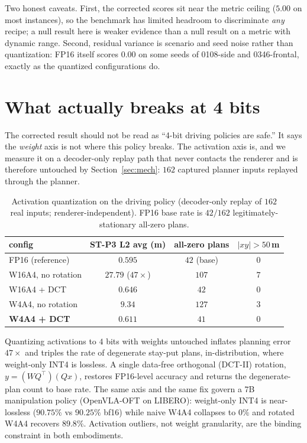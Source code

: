 \documentclass[conference]{IEEEtran}
\begin{document}
Two honest caveats. First, the corrected scores sit near the metric ceiling ($5.00$ on most
instances), so the benchmark has limited headroom to discriminate \emph{any} recipe; a null result
here is weaker evidence than a null result on a metric with dynamic range. Second, residual
variance is scenario and seed noise rather than quantization: FP16 itself scores $0.00$ on some
seeds of 0108-side and 0346-frontal, exactly as the quantized configurations do.

\section{What actually breaks at 4 bits}
The corrected result should not be read as ``4-bit driving policies are safe.'' It says the
\emph{weight} axis is not where this policy breaks. The activation axis is, and we measure it on a
decoder-only replay path that never contacts the renderer and is therefore untouched by
Section~\ref{sec:mech}: $162$ captured planner inputs replayed through the planner.

\begin{table}[t]\centering
\caption{Activation quantization on the driving policy (decoder-only replay of $162$ real inputs;
renderer-independent). FP16 base rate is $42/162$ legitimately-stationary all-zero plans.}
\label{tab:act}
\begin{tabular}{lccc}
\toprule
config & ST-P3 L2 avg (m) & all-zero plans & $|xy|>50$\,m \\
\midrule
FP16 (reference) & $0.595$ & $42$ (base) & $0$ \\
W16A4, no rotation & $\mathbf{27.79}$ ($47\times$) & $107$ & $7$ \\
W16A4 + DCT & $0.646$ & $42$ & $0$ \\
W4A4, no rotation & $9.34$ & $127$ & $3$ \\
\textbf{W4A4 + DCT} & $\mathbf{0.611}$ & $41$ & $0$ \\
\bottomrule
\end{tabular}
\end{table}

Quantizing activations to $4$ bits with weights untouched inflates planning error $47\times$ and
triples the rate of degenerate stay-put plans, in-distribution, where weight-only INT4 is
lossless. A single data-free orthogonal (DCT-II) rotation, $y=(WQ^\top)(Qx)$, restores FP16-level
accuracy and returns the degenerate-plan count to base rate. The same axis and the same fix govern
a 7B manipulation policy (OpenVLA-OFT on LIBERO): weight-only INT4 is near-lossless
($90.75\%$ vs $90.25\%$ bf16) while naive W4A4 collapses to $0\%$ and rotated W4A4 recovers
$89.8\%$. Activation outliers, not weight granularity, are the binding constraint in both
embodiments.
\end{document}
